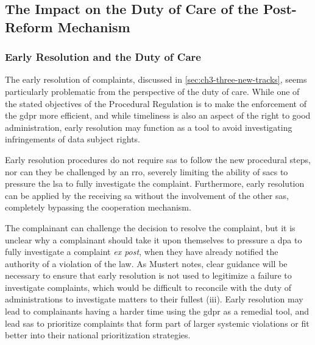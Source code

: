 \subsection{The Impact on the Duty of Care of the Post-Reform Mechanism}
\label{sec:ch4-post-reform-mechanism}

\subsubsection{Early Resolution and the Duty of Care}
\label{sec:ch4-early-resolution}

The early resolution of complaints, discussed in \cref{sec:ch3-three-new-tracks}, seems particularly problematic from the perspective of the duty of care.
While one of the stated objectives of the Procedural Regulation is to make the enforcement of the \gls{gdpr} more efficient, and while timeliness is also an aspect of the right to good administration,\autocite[41(1)]{CFR} early resolution may function as a tool to avoid investigating infringements of data subject rights.

Early resolution procedures do not require \glspl{sa} to follow the new procedural steps,\autocite[5(6)]{ProceduralRegulation} nor can they be challenged by an \gls{rro},\autocite[23(1)(c)]{ProceduralRegulation} severely limiting the ability of \glspl{sac} to pressure the \gls{lsa} to fully investigate the complaint.
Furthermore, early resolution can be applied by the receiving \gls{sa} without the involvement of the other \glspl{sa}, completely bypassing the cooperation mechanism.\autocite[5(1)(a)]{ProceduralRegulation}

The complainant can challenge the decision to resolve the complaint, but it is unclear why a complainant should take it upon themselves to pressure a \gls{dpa} to fully investigate a complaint \emph{ex post},\autocite[III]{mustertTooComplexWork2026} when they have already notified the authority of a violation of the law.
As Mustert notes, clear guidance will be necessary to ensure that early resolution is not used to legitimize a failure to investigate complaints, which would be difficult to reconcile with the duty of administrations to investigate matters to their fullest (iii).\autocite[501]{mustertProceduralisingEnforcement2026}
Early resolution may lead to complainants having a harder time using the \gls{gdpr} as a remedial tool, and lead \glspl{sa} to prioritize complaints that form part of larger systemic violations or fit better into their national prioritization strategies.\autocites[501]{mustertProceduralisingEnforcement2026}[III]{mustertTooComplexWork2026}

